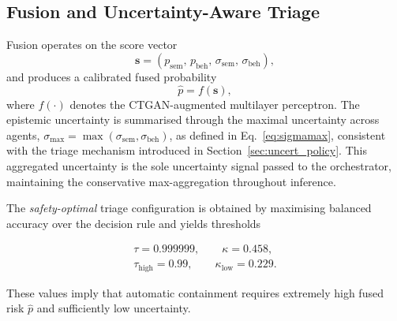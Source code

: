 \documentclass[3p]{elsarticle}
\begin{document}
\subsection{Fusion and Uncertainty-Aware Triage}

Fusion operates on the score vector
\begin{equation}
\mathbf{s} = \left(p_{\mathrm{sem}},\, p_{\mathrm{beh}},\, \sigma_{\mathrm{sem}},\, \sigma_{\mathrm{beh}}\right),
\label{eq:scorevector}
\end{equation}
and produces a calibrated fused probability
\begin{equation}
\hat{p} = f(\mathbf{s}),
\label{eq:fusedp}
\end{equation}
where \(f(\cdot)\) denotes the CTGAN-augmented multilayer perceptron. The epistemic uncertainty is summarised through the maximal uncertainty across agents,
$\sigma_{\max} = \max(\sigma_{\mathrm{sem}}, \sigma_{\mathrm{beh}})$, as defined in
Eq.~\eqref{eq:sigmamax}, consistent with the triage mechanism introduced in
Section~\ref{sec:uncert_policy}. This aggregated uncertainty is the sole uncertainty signal
passed to the orchestrator, maintaining the conservative max-aggregation throughout inference.

The \emph{safety-optimal} triage configuration is obtained by maximising balanced accuracy over the decision rule and yields thresholds

\begin{gather}
\tau = 0.999999,\qquad  \kappa = 0.458, \\
\tau_{\mathrm{high}} = 0.99,\qquad \kappa_{\mathrm{low}} = 0.229.
\label{eq:policy_safety}
\end{gather}


These values imply that automatic containment requires extremely high fused risk \(\hat{p}\)
and sufficiently low uncertainty.
\end{document}
